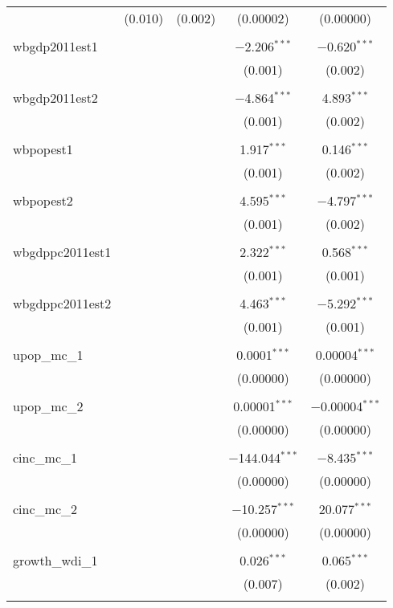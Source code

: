 \begin{table}[!htbp]
\begin{tabular}{@{\extracolsep{5pt}}lcccc}
  & (0.010) & (0.002) & (0.00002) & (0.00000) \\ 
  & & & & \\ 
 wbgdp2011est1 &  &  & $-$2.206$^{***}$ & $-$0.620$^{***}$ \\ 
  &  &  & (0.001) & (0.002) \\ 
  & & & & \\ 
 wbgdp2011est2 &  &  & $-$4.864$^{***}$ & 4.893$^{***}$ \\ 
  &  &  & (0.001) & (0.002) \\ 
  & & & & \\ 
 wbpopest1 &  &  & 1.917$^{***}$ & 0.146$^{***}$ \\ 
  &  &  & (0.001) & (0.002) \\ 
  & & & & \\ 
 wbpopest2 &  &  & 4.595$^{***}$ & $-$4.797$^{***}$ \\ 
  &  &  & (0.001) & (0.002) \\ 
  & & & & \\ 
 wbgdppc2011est1 &  &  & 2.322$^{***}$ & 0.568$^{***}$ \\ 
  &  &  & (0.001) & (0.001) \\ 
  & & & & \\ 
 wbgdppc2011est2 &  &  & 4.463$^{***}$ & $-$5.292$^{***}$ \\ 
  &  &  & (0.001) & (0.001) \\ 
  & & & & \\ 
 upop\_mc\_1 &  &  & 0.0001$^{***}$ & 0.00004$^{***}$ \\ 
  &  &  & (0.00000) & (0.00000) \\ 
  & & & & \\ 
 upop\_mc\_2 &  &  & 0.00001$^{***}$ & $-$0.00004$^{***}$ \\ 
  &  &  & (0.00000) & (0.00000) \\ 
  & & & & \\ 
 cinc\_mc\_1 &  &  & $-$144.044$^{***}$ & $-$8.435$^{***}$ \\ 
  &  &  & (0.00000) & (0.00000) \\ 
  & & & & \\ 
 cinc\_mc\_2 &  &  & $-$10.257$^{***}$ & 20.077$^{***}$ \\ 
  &  &  & (0.00000) & (0.00000) \\ 
  & & & & \\ 
 growth\_wdi\_1 &  &  & 0.026$^{***}$ & 0.065$^{***}$ \\ 
  &  &  & (0.007) & (0.002) \\ 
  & & & & \\ 

\end{tabular}
\end{table}
